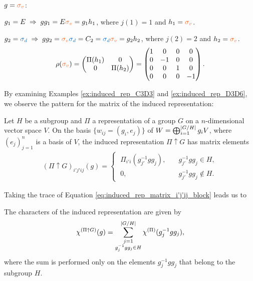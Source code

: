 \begin{example}
\n

$g = \sv$:

$g_1 = E \implies g g_1 = E \sv = g_1 h_1$, where $j(1) = 1$ and $h_1 = \sv$.

$g_2 = \sd \implies g g_2 = \sv \sd = C_2 = \sd \sv = g_2 h_2$, where $j(2) = 2$ and $h_2 = \sv$.
\begin{equation} \label{eq:rhosv_matrix_example_inducedrep_D6}
\rho(\sv) =
\begin{pmatrix}
\Pi(h_1) & 0 \\
0 & \Pi(h_2)
\end{pmatrix}
=
\begin{pmatrix}
1 & 0  & 0 &  0 \\
0 & -1 & 0 &  0 \\
0 & 0  & 1 &  0 \\
0 & 0  & 0 & -1 \\
\end{pmatrix}.
\end{equation}

\end{example}

By examining Examples \ref{ex:induced_rep_C3D3} and \ref{ex:induced_rep_D3D6}, we observe the pattern for the matrix of the induced representation:

\begin{lemma} \label{lemma:induced_rep_matrix_i'j'ij_block}
Let $H$ be a subgroup and $\Pi$ a representation of a group $G$ on a $n$-dimensional vector space $V$. On the basis $\{w_{ij} = (g_i, e_j)\}$ of $W = \bigoplus_{i=1}^{\abs{G/H}} g_i V$, where $(e_j)_{j=1}^n$ is a basis of $V$, the induced representation $\Pi \uparrow G$ has matrix elements
\begin{align} \label{eq:induced_rep_matrix_i'j'ij_block}
(\Pi \uparrow G)_{i'j'ij}(g) =
\begin{cases}
\; \Pi_{i'i}(g_{j'}^{-1} g g_j), \quad & g_{j'}^{-1} g g_j \in H, \\
\; 0,  & g_{j'}^{-1} g g_j \notin H.
\end{cases}
\end{align}
\end{lemma}

Taking the trace of Equation \ref{eq:induced_rep_matrix_i'j'ij_block} leads us to

\begin{corollary} \label{coro:character_of_induced_rep}
The characters of the induced representation are given by
\begin{equation} \label{eq:character_induced_rep}
\chi^{(\Pi \uparrow G)}(g) = \sum_{\substack{j=1 \\ g_j^{-1} g g_j \in H}}^{\abs{G/H}} \chi^{(\Pi)} (g_j^{-1} g g_j),
\end{equation}
where the sum is performed only on the elements $g_j^{-1} g g_j$ that belong to the subgroup $H$.
\end{corollary}


